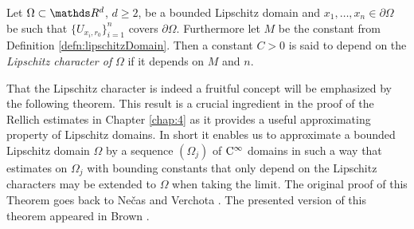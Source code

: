   \begin{defn}
    Let $\Omega \subset \R^d$, $d \geq 2$, be a bounded Lipschitz domain and $x_1, \dots,x_n \in \partial\Omega$ be such that $\{U_{x_i,r_0} \}_{i = 1}^n$ covers $\partial\Omega$.  
    Furthermore let $M$ be the constant from Definition \ref{defn:lipschitzDomain}.
    Then a constant $C > 0$ is said to depend on the \emph{Lipschitz character of} $\Omega$ if it depends on $M$ and $n$.
  \end{defn}

  That the Lipschitz character is indeed a fruitful concept will be emphasized by the following theorem.
  This result is a crucial ingredient in the proof of the Rellich estimates in Chapter \ref{chap:4} as it provides a useful approximating property of Lipschitz domains. In short it enables us to approximate a bounded Lipschitz domain $\Omega$ by a sequence $(\Omega_j)$ of $\mathrm{C}^\infty$ domains in such a way that estimates on $\Omega_j$ with bounding constants that only depend on the Lipschitz characters may be extended to $\Omega$ when taking the limit.
  The original proof of this Theorem goes back to Ne\v{c}as \cite{necas} and Verchota \cite{verchota} . 
  The presented version of this theorem appeared in Brown \cite{brown}.

